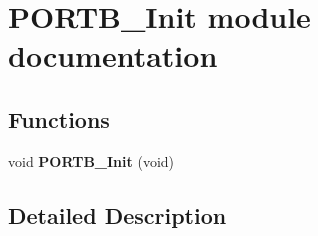 \hypertarget{group___p_o_r_t_b___init__module}{}\section{P\+O\+R\+T\+B\+\_\+\+Init module documentation}
\label{group___p_o_r_t_b___init__module}
\subsection*{Functions}
\begin{DoxyCompactItemize}
\item 
void {\bfseries P\+O\+R\+T\+B\+\_\+\+Init} (void)\hypertarget{group___p_o_r_t_b___init__module_ga08f177ba6d7d734c1a7e9f20c883daeb}{}\label{group___p_o_r_t_b___init__module_ga08f177ba6d7d734c1a7e9f20c883daeb}

\end{DoxyCompactItemize}


\subsection{Detailed Description}
